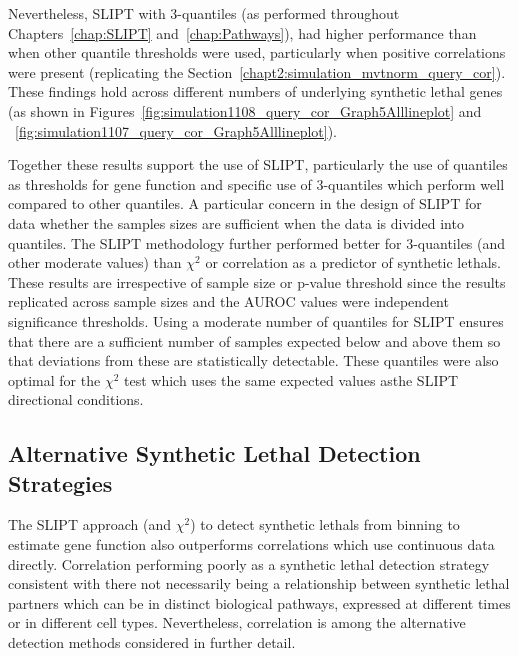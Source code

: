 Nevertheless, \gls{SLIPT} with 3-quantiles (as performed throughout Chapters~\ref{chap:SLIPT} and~\ref{chap:Pathways}), had higher performance than  when other quantile thresholds were used, particularly when positive correlations were present (replicating the Section~\ref{chapt2:simulation_mvtnorm_query_cor}). These findings hold across different numbers of underlying \gls{synthetic lethal} genes (as shown in Figures~\ref{fig:simulation1108_query_cor_Graph5Alllineplot} and ~\ref{fig:simulation1107_query_cor_Graph5Alllineplot}).

Together these results support the use of \gls{SLIPT}, particularly the use of quantiles as thresholds for gene function and specific use of 3-quantiles which perform well compared to other quantiles. A particular concern in the design of \gls{SLIPT} for  data whether the  samples sizes are sufficient when the data is divided into quantiles. The \gls{SLIPT} methodology further performed better for 3-quantiles (and other moderate values) than $\chi^2$ or correlation as a predictor of \glspl{synthetic lethal}. These results are irrespective of sample size or p-value threshold since the results replicated across sample sizes and the \gls{AUROC} values were independent significance thresholds. Using a moderate number of quantiles for \gls{SLIPT} ensures that there are a sufficient number of samples expected below and above them so that deviations from these are statistically detectable. These quantiles were also optimal for the $\chi^2$ test which uses the same expected values asthe \gls{SLIPT} directional conditions.

\FloatBarrier

\subsection{Alternative Synthetic Lethal Detection Strategies}

The \gls{SLIPT} approach (and $\chi^2$) to detect \glspl{synthetic lethal} from binning  to estimate gene function also outperforms correlations which use continuous data directly. Correlation performing poorly as a \gls{synthetic lethal} detection strategy consistent with there not necessarily being a relationship between \gls{synthetic lethal} partners which can be in distinct biological pathways, expressed at different times or in different cell types. Nevertheless, correlation is among the alternative detection methods considered in further detail.

